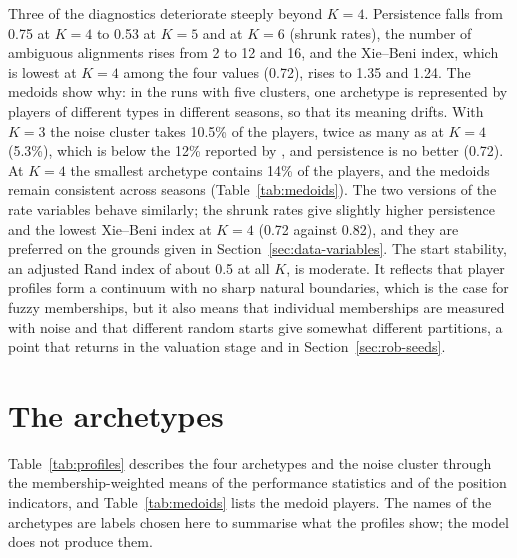 Three of the diagnostics deteriorate steeply beyond $K=4$. Persistence falls from 0.75 at $K=4$ to 0.53 at $K=5$ and at $K=6$ (shrunk rates), the number of ambiguous alignments rises from 2 to 12 and 16, and the Xie--Beni index, which is lowest at $K=4$ among the four values (0.72), rises to 1.35 and 1.24. The medoids show why: in the runs with five clusters, one archetype is represented by players of different types in different seasons, so that its meaning drifts. With $K=3$ the noise cluster takes 10.5\% of the players, twice as many as at $K=4$ (5.3\%), which is below the 12\% reported by , and persistence is no better (0.72). At $K=4$ the smallest archetype contains 14\% of the players, and the medoids remain consistent across seasons (Table~\ref{tab:medoids}). The two versions of the rate variables behave similarly; the shrunk rates give slightly higher persistence and the lowest Xie--Beni index at $K=4$ (0.72 against 0.82), and they are preferred on the grounds given in Section~\ref{sec:data-variables}. The start stability, an adjusted Rand index of about 0.5 at all $K$, is moderate. It reflects that player profiles form a continuum with no sharp natural boundaries, which is the case for fuzzy memberships, but it also means that individual memberships are measured with noise and that different random starts give somewhat different partitions, a point that returns in the valuation stage and in Section~\ref{sec:rob-seeds}.

\section{The archetypes}
\label{sec:results-archetypes}

Table~\ref{tab:profiles} describes the four archetypes and the noise cluster through the membership-weighted means of the performance statistics and of the position indicators, and Table~\ref{tab:medoids} lists the medoid players. The names of the archetypes are labels chosen here to summarise what the profiles show; the model does not produce them.

